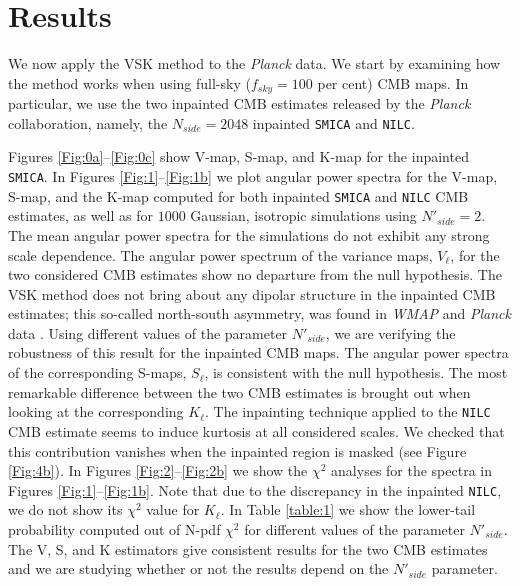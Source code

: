 \section{Results}
\label{s:results}

We now apply the VSK method to the \textit{Planck} data. We start by examining how the method works when using full-sky ($f_{sky}=100$ per cent) CMB maps. In particular, we use the two inpainted CMB estimates released by the \textit{Planck} collaboration, namely, the $N_{side}=2048$ inpainted \texttt{SMICA} and \texttt{NILC}. 

Figures \ref{Fig:0a}--\ref{Fig:0c} show V-map, S-map, and K-map for the inpainted \texttt{SMICA}. In Figures \ref{Fig:1}--\ref{Fig:1b} we plot angular power spectra for the V-map, S-map, and the K-map computed for both inpainted \texttt{SMICA} and \texttt{NILC} CMB estimates, as well as for $1000$ Gaussian, isotropic simulations using $N'_{side} = 2$. The mean angular power spectra for the simulations do not exhibit any strong scale dependence. The angular power spectrum of the variance maps, $V_{\ell}$, for the two considered CMB estimates show no departure from the null hypothesis. %
The VSK method does not bring about any dipolar structure in the inpainted CMB estimates; this so-called north-south asymmetry, was found in \textit{WMAP} and \textit{Planck} data \cite{Eriksen:2003db,Hansen:2008ym,Ade:2013nlj,Akrami:2014eta}. Using different values of the parameter $N'_{side}$, we are verifying the robustness of this result for the inpainted CMB maps. The angular power spectra of the corresponding S-maps, $S_{\ell}$, is consistent with the null hypothesis. 
The most remarkable difference between the two CMB estimates is brought out when looking at the corresponding $K_{\ell}$. The inpainting technique applied to the \texttt{NILC} CMB estimate seems to induce kurtosis at all considered scales. We checked that this contribution vanishes when the inpainted region is masked (see Figure \ref{Fig:4b}). %
In Figures \ref{Fig:2}--\ref{Fig:2b} we show the $\chi^2$ analyses for the spectra in Figures \ref{Fig:1}--\ref{Fig:1b}. Note that due to the discrepancy in the inpainted \texttt{NILC}, we do not show its $\chi^2$ value for $K_{\ell}$. In Table \ref{table:1} we show the lower-tail probability computed out of N-pdf $\chi^2$ for different values of the parameter $N'_{side}$. The V, S, and K estimators give consistent results for the two CMB estimates and we are studying whether or not the results depend on the $N'_{side}$ parameter. %
